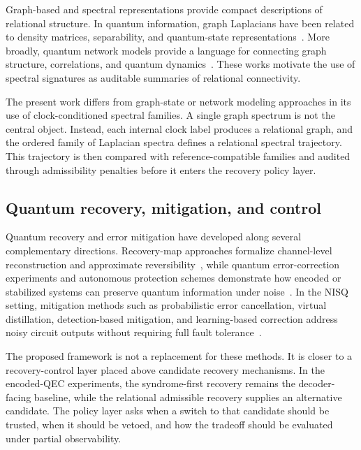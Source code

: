 \documentclass{iopjournal}
\begin{document}
Graph-based and spectral representations provide compact descriptions of relational 
structure. In quantum information, graph Laplacians have been related to density matrices, 
separability, and quantum-state representations~\cite{Braunstein2006GraphLaplacianDensityMatrix,Adhikari2017WeightedDigraphsQuantumStates,Bradshaw2023GraphZetaEntanglement}. 
More broadly, quantum network models provide a language for connecting graph structure, 
correlations, and quantum dynamics~\cite{Biamonte2019ComplexNetworksQuantum}. These works 
motivate the use of spectral signatures as auditable summaries of relational connectivity.

The present work differs from graph-state or network modeling approaches in its use of 
clock-conditioned spectral families. A single graph spectrum is not the central object. 
Instead, each internal clock label produces a relational graph, and the ordered family of 
Laplacian spectra defines a relational spectral trajectory. This trajectory is then compared 
with reference-compatible families and audited through admissibility penalties before it 
enters the recovery policy layer.

\subsection{Quantum recovery, mitigation, and control}
Quantum recovery and error mitigation have developed along several complementary directions. 
Recovery-map approaches formalize channel-level reconstruction and approximate reversibility~\cite{Lautenbacher2024PetzRecoveryQudit}, 
while quantum error-correction experiments and autonomous protection schemes demonstrate 
how encoded or stabilized systems can preserve quantum information under noise~\cite{Reed2013EntanglementQEC,Gertler2021AutonomousQECBosonic,Nascimento2011NoiselessSubsystem}. In the NISQ setting, mitigation methods such as probabilistic error cancellation, virtual distillation, detection-based mitigation, and learning-based correction address noisy circuit outputs without requiring full fault tolerance~\cite{VanDenBerg2023SparsePauliLindbladPEC,Xu2024CircuitNoiseResilientVirtualDistillation,Zhang2021AutoencoderErrorMitigation,Strikis2021LearningBasedQEM,Liao2024MachineLearningQEM,Liao2025NoiseAgnosticQEM}.

The proposed framework is not a replacement for these methods. It is closer 
to a recovery-control layer placed above candidate recovery mechanisms. In the 
encoded-QEC experiments, the syndrome-first recovery remains the decoder-facing 
baseline, while the relational admissible recovery supplies an alternative candidate. 
The policy layer asks when a switch to that candidate should be trusted, when it 
should be vetoed, and how the tradeoff should be evaluated under partial observability.
\end{document}
